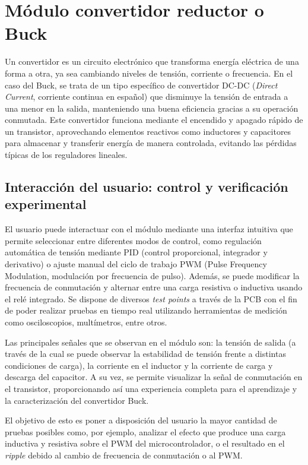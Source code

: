 \section{Módulo convertidor reductor o Buck}

Un convertidor es un circuito electrónico que transforma energía eléctrica de una forma a otra, ya sea cambiando niveles de tensión, corriente o frecuencia. En el caso del Buck, se trata de un tipo específico de convertidor DC-DC (\textit{Direct Current}, corriente continua en español) que disminuye la tensión de entrada a una menor en la salida, manteniendo una buena eficiencia gracias a su operación conmutada. Este convertidor funciona mediante el encendido y apagado rápido de un transistor, aprovechando elementos reactivos como inductores y capacitores para almacenar y transferir energía de manera controlada, evitando las pérdidas típicas de los reguladores lineales.

\subsection{Interacción del usuario: control y verificación experimental}

El usuario puede interactuar con el módulo mediante una interfaz intuitiva que permite seleccionar entre diferentes modos de control, como regulación automática de tensión mediante PID (control proporcional, integrador y derivativo) o ajuste manual del ciclo de trabajo PWM  (Pulse Frequency Modulation, modulación por frecuencia de pulso). Además, se puede modificar la frecuencia de conmutación y alternar entre una carga resistiva o inductiva usando el relé integrado. Se dispone de diversos \textit{test points} a través de la PCB con el fin de poder realizar pruebas en tiempo real utilizando herramientas de medición como osciloscopios, multímetros, entre otros.

Las principales señales que se observan en el módulo son: la tensión de salida (a través de la cual se puede observar la estabilidad de tensión frente a distintas condiciones de carga), la corriente en el inductor y la corriente de carga y descarga del capacitor. A su vez, se permite visualizar la señal de conmutación en el transistor, proporcionando así una experiencia completa para el aprendizaje y la caracterización del convertidor Buck.

El objetivo de esto es poner a disposición del usuario la mayor cantidad de pruebas posibles como, por ejemplo, analizar el efecto que produce una carga inductiva y resistiva sobre el PWM del microcontrolador, o el resultado en el \textit{ripple} debido al cambio de frecuencia de conmutación o al PWM. 

